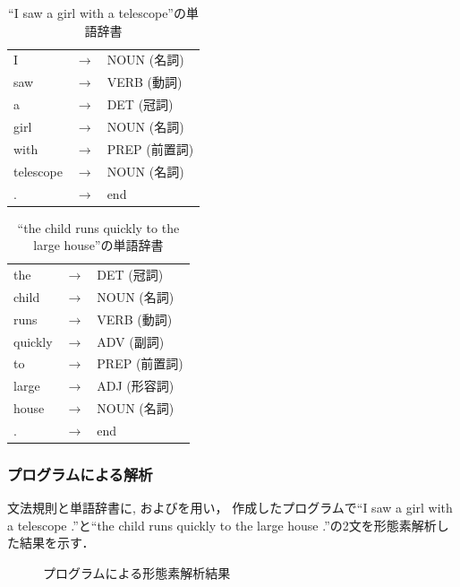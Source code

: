\documentclass[uplatex, dvipdfmx, a4paper, twocolumn]{jsarticle}
\begin{document}
      \begin{table}[htb]
        \centering
        \caption{``I saw a girl with a telescope''の単語辞書}
        \label{tab:dict_girl_network}
        \begin{tabular}{l c l} \hline
          I & $\to$ & NOUN (名詞) \\
          saw & $\to$ & VERB (動詞) \\
          a & $\to$ & DET (冠詞) \\
          girl & $\to$ & NOUN (名詞) \\
          with & $\to$ & PREP (前置詞) \\
          telescope & $\to$ & NOUN (名詞) \\
          . & $\to$ & end \\ \hline
        \end{tabular}
      \end{table}
      \begin{table}[htb]
        \centering
        \caption{``the child runs quickly to the large house''の単語辞書}
        \label{tab:dict_child_network}
        \begin{tabular}{l c l} \hline
          the & $\to$ & DET (冠詞) \\
          child & $\to$ & NOUN (名詞) \\
          runs & $\to$ & VERB (動詞) \\
          quickly & $\to$ & ADV (副詞) \\
          to & $\to$ & PREP (前置詞) \\
          large & $\to$ & ADJ (形容詞) \\
          house & $\to$ & NOUN (名詞) \\
          . & $\to$ & end \\ \hline
        \end{tabular}
      \end{table}

      \subsubsection{プログラムによる解析}
      文法規則と単語辞書に, およびを用い，
      作成したプログラムで``I saw a girl with a telescope .''と``the child runs quickly to the large house .''の2文を形態素解析した結果を示す．
      \begin{figure}[htpb]
        \centering
        \caption{プログラムによる形態素解析結果}
        \label{fig:result_network}
      \end{figure}
\end{document}
